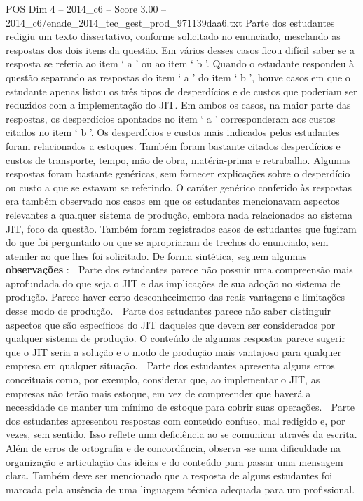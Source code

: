 \begin{textsample}{POS Dim 4 – 2014\_c6 – Score 3.00 – 2014\_c6/enade\_2014\_tec\_gest\_prod\_971139daa6.txt}
Parte dos estudantes redigiu um texto dissertativo, conforme solicitado no enunciado, mesclando as respostas dos dois itens da questão.
Em vários desses casos ficou difícil saber se a resposta se referia ao item ‘ a ’ ou ao item ‘ b ’.
Quando o estudante respondeu à questão separando as respostas do item ‘ a ’ do item ‘ b ’, houve casos em que o estudante apenas listou os três tipos de desperdícios e de custos que poderiam ser reduzidos com a implementação do JIT.
Em ambos os casos, na maior parte das respostas, os desperdícios apontados no item ‘ a ’ corresponderam aos custos citados no item ‘ b ’.
Os desperdícios e custos mais indicados pelos estudantes foram relacionados a estoques.
Também foram bastante citados desperdícios e custos de transporte, tempo, mão de obra, matéria-prima e retrabalho.
Algumas respostas foram bastante genéricas, sem fornecer explicações sobre o desperdício ou custo a que se estavam se referindo.
O caráter genérico conferido às respostas era também observado nos casos em que os estudantes mencionavam aspectos relevantes a qualquer sistema de produção, embora nada relacionados ao sistema JIT, foco da questão.
Também foram registrados casos de estudantes que fugiram do que foi perguntado ou que se apropriaram de trechos do enunciado, sem atender ao que lhes foi solicitado.
De forma sintética, seguem algumas \textbf{observações} :  Parte dos estudantes parece não possuir uma compreensão mais aprofundada do que seja o JIT e das implicações de sua adoção no sistema de produção.
Parece haver certo desconhecimento das reais vantagens e limitações desse modo de produção.  Parte dos estudantes parece não saber distinguir aspectos que são específicos do JIT daqueles que devem ser considerados por qualquer sistema de produção.
O conteúdo de algumas respostas parece sugerir que o JIT seria a solução e o modo de produção mais vantajoso para qualquer empresa em qualquer situação.  Parte dos estudantes apresenta alguns erros conceituais como, por exemplo, considerar que, ao implementar o JIT, as empresas não terão mais estoque, em vez de compreender que haverá a necessidade de manter um mínimo de estoque para cobrir suas operações.  Parte dos estudantes apresentou respostas com conteúdo confuso, mal redigido e, por vezes, sem sentido.
Isso reflete uma deficiência ao se comunicar através da escrita.
Além de erros de ortografia e de concordância, observa -se uma dificuldade na organização e articulação das ideias e do conteúdo para passar uma mensagem clara.
Também deve ser mencionado que a resposta de alguns estudantes foi marcada pela ausência de uma linguagem técnica adequada para um profissional.

\end{textsample}
